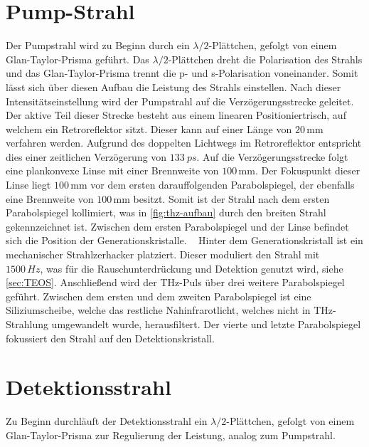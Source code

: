 \section{Pump-Strahl}
\label{sec:pump}
Der Pumpstrahl wird zu Beginn durch ein $\lambda/2$-Plättchen, gefolgt von einem Glan-Taylor-Prisma geführt. 
Das $\lambda/2$-Plättchen dreht die Polarisation des Strahls und das Glan-Taylor-Prisma trennt die p- und s-Polarisation 
voneinander. 
Somit lässt sich über diesen Aufbau die Leistung des Strahls einstellen. 
Nach dieser Intensitätseinstellung wird der Pumpstrahl auf die Verzögerungsstrecke geleitet. 
Der aktive Teil dieser Strecke besteht aus einem linearen Positioniertrisch, auf welchem ein Retroreflektor sitzt.
Dieser kann auf einer Länge von $20\,\unit{\milli\meter}$ verfahren werden.
Aufgrund des doppelten Lichtwegs im Retroreflektor entspricht dies einer zeitlichen Verzögerung von $\SI{133}{ps}$.
Auf die Verzögerungsstrecke folgt eine plankonvexe Linse mit einer Brennweite von $100\,\unit{\milli\meter}$. 
Der Fokuspunkt dieser Linse liegt $100\,\unit{\milli\meter}$ vor dem ersten darauffolgenden Parabolspiegel, 
der ebenfalls eine Brennweite von $100\,\unit{\milli\meter}$ besitzt. Somit ist der Strahl nach dem ersten 
Parabolspiegel kollimiert, was in \autoref{fig:thz-aufbau} durch den breiten Strahl gekennzeichnet ist. 
Zwischen dem ersten Parabolspiegel und der Linse befindet sich die Position der Generationskristalle.  
Hinter dem Generationskristall ist ein mechanischer Strahlzerhacker platziert. Dieser moduliert den Strahl mit  
$1500\,\unit{Hz}$, was für die Rauschunterdrückung und Detektion genutzt wird, siehe \autoref{sec:TEOS}.
Anschließend wird der THz-Puls über drei weitere Parabolspiegel geführt.
Zwischen dem ersten und dem zweiten Parabolspiegel ist eine Siliziumscheibe, welche das 
restliche Nahinfrarotlicht, welches nicht in THz-Strahlung umgewandelt wurde, herausfiltert. 
Der vierte und letzte Parabolspiegel fokussiert den Strahl auf den Detektionskristall. 



\section{Detektionsstrahl}
\label{sec:probe}


Zu Beginn durchläuft der Detektionsstrahl ein $\lambda/2$-Plättchen, gefolgt von einem Glan-Taylor-Prisma zur Regulierung 
der Leistung, analog zum Pumpstrahl. 


